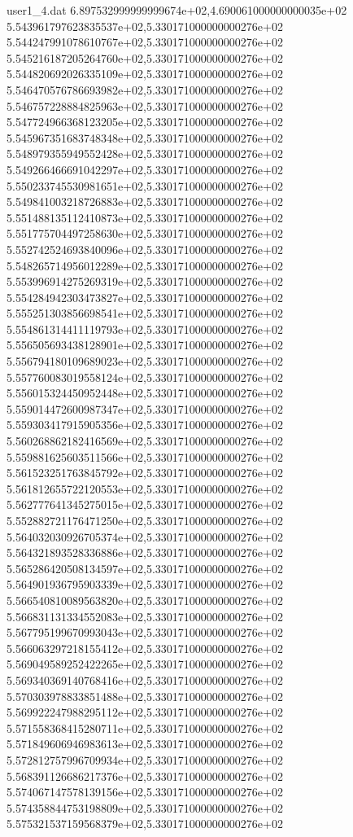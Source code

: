 \begin{filecontents}{user1_4.dat}
6.897532999999999674e+02,4.690061000000000035e+02
5.543961797623835537e+02,5.330171000000000276e+02
5.544247991078610767e+02,5.330171000000000276e+02
5.545216187205264760e+02,5.330171000000000276e+02
5.544820692026335109e+02,5.330171000000000276e+02
5.546470576786693982e+02,5.330171000000000276e+02
5.546757228884825963e+02,5.330171000000000276e+02
5.547724966368123205e+02,5.330171000000000276e+02
5.545967351683748348e+02,5.330171000000000276e+02
5.548979355949552428e+02,5.330171000000000276e+02
5.549266466691042297e+02,5.330171000000000276e+02
5.550233745530981651e+02,5.330171000000000276e+02
5.549841003218726883e+02,5.330171000000000276e+02
5.551488135112410873e+02,5.330171000000000276e+02
5.551775704497258630e+02,5.330171000000000276e+02
5.552742524693840096e+02,5.330171000000000276e+02
5.548265714956012289e+02,5.330171000000000276e+02
5.553996914275269319e+02,5.330171000000000276e+02
5.554284942303473827e+02,5.330171000000000276e+02
5.555251303856698541e+02,5.330171000000000276e+02
5.554861314411119793e+02,5.330171000000000276e+02
5.556505693438128901e+02,5.330171000000000276e+02
5.556794180109689023e+02,5.330171000000000276e+02
5.557760083019558124e+02,5.330171000000000276e+02
5.556015324450952448e+02,5.330171000000000276e+02
5.559014472600987347e+02,5.330171000000000276e+02
5.559303417915905356e+02,5.330171000000000276e+02
5.560268862182416569e+02,5.330171000000000276e+02
5.559881625603511566e+02,5.330171000000000276e+02
5.561523251763845792e+02,5.330171000000000276e+02
5.561812655722120553e+02,5.330171000000000276e+02
5.562777641345275015e+02,5.330171000000000276e+02
5.552882721176471250e+02,5.330171000000000276e+02
5.564032030926705374e+02,5.330171000000000276e+02
5.564321893528336886e+02,5.330171000000000276e+02
5.565286420508134597e+02,5.330171000000000276e+02
5.564901936795903339e+02,5.330171000000000276e+02
5.566540810089563820e+02,5.330171000000000276e+02
5.566831131334552083e+02,5.330171000000000276e+02
5.567795199670993043e+02,5.330171000000000276e+02
5.566063297218155412e+02,5.330171000000000276e+02
5.569049589252422265e+02,5.330171000000000276e+02
5.569340369140768416e+02,5.330171000000000276e+02
5.570303978833851488e+02,5.330171000000000276e+02
5.569922247988295112e+02,5.330171000000000276e+02
5.571558368415280711e+02,5.330171000000000276e+02
5.571849606946983613e+02,5.330171000000000276e+02
5.572812757996709934e+02,5.330171000000000276e+02
5.568391126686217376e+02,5.330171000000000276e+02
5.574067147578139156e+02,5.330171000000000276e+02
5.574358844753198809e+02,5.330171000000000276e+02
5.575321537159568379e+02,5.330171000000000276e+02

\end{filecontents}
